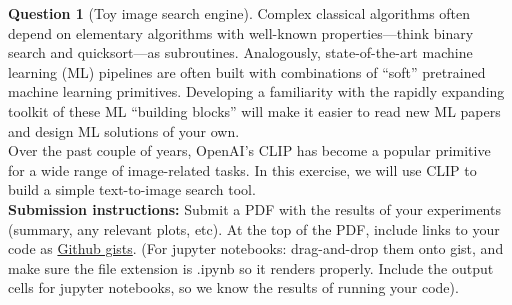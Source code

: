\documentclass{article}
\theoremstyle{definition}
\newtheorem{question}{Question}
\begin{document}
\begin{question}[Toy image search engine]
Complex classical algorithms often depend on elementary algorithms with well-known properties---think binary search and quicksort---as subroutines. Analogously, state-of-the-art machine learning (ML) pipelines are often built with combinations of ``soft'' pretrained machine learning primitives. Developing a familiarity with the rapidly expanding toolkit of these ML ``building blocks'' will make it easier to read new ML papers and design ML solutions of your own. \\

Over the past couple of years, OpenAI's CLIP has become a popular primitive for a wide range of image-related tasks. In this exercise, we will use CLIP to build a simple text-to-image search tool. \\

{\color{blue} \textbf{Submission instructions:} Submit a PDF with the results of your experiments
(summary, any relevant plots, etc). At the top of the PDF, include links to your
code as \href{https://gist.github.com/}{Github gists}. (For jupyter notebooks: drag-and-drop them onto gist, and make sure the file extension is .ipynb so it renders properly. Include the output cells for jupyter
notebooks, so we know the results of running your code).
}
    \end{question}
\end{document}

